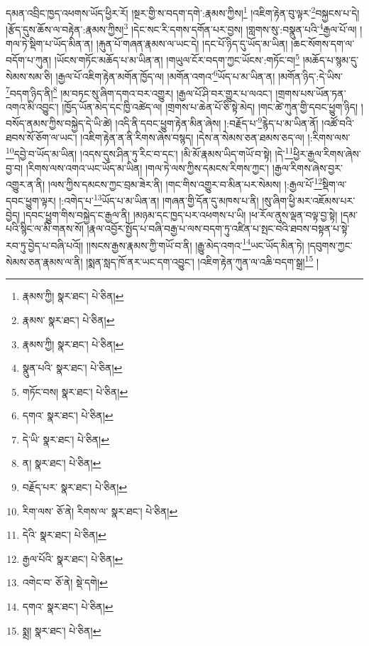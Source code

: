 དམན་འབྲིང་ཁྱད་འཕགས་ཡོད་ཕྱིར་རོ། །སྔར་གྱི་ས་བདག་དགེ་:རྣམས་ཀྱིས།\footnote{རྣམས་ཀྱི།  སྣར་ཐང་།  པེ་ཅིན། } །འཇིག་རྟེན་བུ་ལྟར་\footnote{རྣམས་  སྣར་ཐང་།  པེ་ཅིན། }བསྐྱངས་པ་དེ། །རྩོད་དུས་ཆོས་ལ་བརྟེན་:རྣམས་ཀྱིས།\footnote{རྣམས་ཀྱི།  སྣར་ཐང་།  པེ་ཅིན། } །དེང་སང་རི་དགས་དགོན་པར་བྱས། །གླགས་སུ་:བསྣུན་པའི་\footnote{སྣུན་པའི་  སྣར་ཐང་།  པེ་ཅིན། }རྒྱལ་པོ་ལ། །གལ་ཏེ་སྡིག་པ་ཡོད་མིན་ན། །རྐུན་པོ་གཞན་རྣམས་ལ་ཡང་དེ། །དང་པོ་ཉིད་དུ་ཡོད་མ་ཡིན། །ཆང་སོགས་དག་ལ་བདོག་པ་ཀུན། །ཡོངས་གཏོང་མཆོད་པ་མ་ཡིན་ན། །གཡུལ་ངོར་བདག་ཀྱང་ཡོངས་:གཏོང་བ།\footnote{གཏོང་བས།  སྣར་ཐང་།  པེ་ཅིན། } །མཆོད་པ་སྙམ་དུ་སེམས་སམ་ཅི། །རྒྱལ་པོ་འཇིག་རྟེན་མགོན་ཁྱོད་ལ། །མགོན་འགའ་\footnote{དགའ་  སྣར་ཐང་།  པེ་ཅིན། }ཡོད་པ་མ་ཡིན་ན། །མགོན་ཉིད་:དེ་ཡིས་\footnote{དེ་ཡི་  སྣར་ཐང་།  པེ་ཅིན། }བདག་ཉིད་ནི།\footnote{ན།  སྣར་ཐང་།  པེ་ཅིན། } །མ་བཏང་སུ་ཞིག་དགའ་བར་འགྱུར། །རྒྱལ་པོ་ཤི་བར་གྱུར་པ་ལའང་། །གྲགས་པས་ཡོན་ཏན་འགའ་མི་འབྱུང་། །ཁྱོད་ཡོན་མེད་དང་ཁྱི་འཚེད་ལ། །གྲགས་པ་ཆེན་པོ་ཅི་སྟེ་མེད། །གང་ཚེ་ཀུན་གྱི་དབང་ཕྱུག་ཉིད། །བསོད་ནམས་ཀྱིས་བསྐྱེད་དེ་ཡི་ཚེ། །འདི་ནི་དབང་ཕྱུག་རྟེན་མིན་ཞེས། །:བརྗོད་པ་\footnote{བརྗོད་པར་  སྣར་ཐང་།  པེ་ཅིན། }རྙེད་པ་མ་ཡིན་ནོ། །འཚོ་བའི་ཐབས་སོ་ཅོག་ལ་ཡང་། །འཇིག་རྟེན་ན་ནི་རིགས་ཞེས་བསྙད། །དེས་ན་སེམས་ཅན་ཐམས་ཅད་ལ། །:རིགས་ལས་\footnote{རིག་ལས་  ཅོ་ནེ། རིགས་ལ་  སྣར་ཐང་།  པེ་ཅིན། }དབྱེ་བ་ཡོད་མ་ཡིན། །འདས་དུས་ཤིན་ཏུ་རིང་བ་དང་། །མི་མོ་རྣམས་ཡིད་གཡོ་བ་སྟེ། །དེ་\footnote{དེའི་  སྣར་ཐང་།  པེ་ཅིན། }ཕྱིར་རྒྱལ་རིགས་ཞེས་བྱ་བ། །རིགས་ལས་འགའ་ཡང་ཡོད་མ་ཡིན། །གལ་ཏེ་ལས་ཀྱིས་དམངས་རིགས་ཀྱང་། །རྒྱལ་རིགས་ཞེས་བྱར་འགྱུར་ན་ནི། །ལས་ཀྱིས་དམངས་ཀྱང་བྲམ་ཟེར་ནི། །གང་གིས་འགྱུར་བ་མིན་པར་སེམས། །:རྒྱལ་པོ་\footnote{རྒྱལ་པོའི་  སྣར་ཐང་།  པེ་ཅིན། }སྡིག་ལ་དབང་ཕྱུག་ལྟར། །:འགེད་པ་\footnote{འགེང་བ་  ཅོ་ནེ།  སྡེ་དགེ། }ཡོད་པ་མ་ཡིན་ན། །གཞན་གྱི་དོན་དུ་མཁས་པ་ནི། །སུ་ཞིག་ཕྱི་མར་འཇོམས་པར་བྱེད། །དབང་ཕྱུག་གིས་བསྐྱེད་ང་རྒྱལ་ནི། །མཉམ་དང་ཁྱད་པར་འཕགས་པ་ཡི། །ཕ་རོལ་ནུས་ལྡན་བལྟ་བྱ་སྟེ། །དམ་པའི་སྙིང་ལ་མི་གནས་སོ། །རྣལ་འབྱོར་སྤྱོད་པ་བཞི་བརྒྱ་པ་ལས་བདག་ཏུ་འཛིན་པ་སྤང་བའི་ཐབས་བསྟན་པ་སྟེ་རབ་ཏུ་བྱེད་པ་བཞི་པའོ།། །།སངས་རྒྱས་རྣམས་ཀྱི་གཡོ་བ་ནི། །རྒྱུ་མེད་འགའ་\footnote{དགའ་  སྣར་ཐང་།  པེ་ཅིན། }ཡང་ཡོད་མིན་ཏེ། །དབུགས་ཀྱང་སེམས་ཅན་རྣམས་ལ་ནི། །སྨན་སླད་ཁོ་ནར་ཡང་དག་འབྱུང་། །འཇིག་རྟེན་ཀུན་ལ་འཆི་བདག་སྒྲ།\footnote{སྨྲ།  སྣར་ཐང་།  པེ་ཅིན། } །

